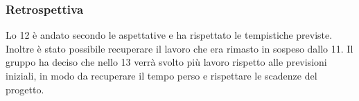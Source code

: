 \subsubsection{Retrospettiva}
\label{sec:retrospettiva_sprint12}

Lo  12 è andato secondo le aspettative e ha rispettato le tempistiche previste. 
Inoltre è stato possibile recuperare il lavoro che era rimasto in sospeso dallo  11.
Il gruppo ha deciso che nello  13 verrà svolto più lavoro rispetto alle previsioni iniziali, in modo da recuperare il tempo perso e rispettare le scadenze del progetto.